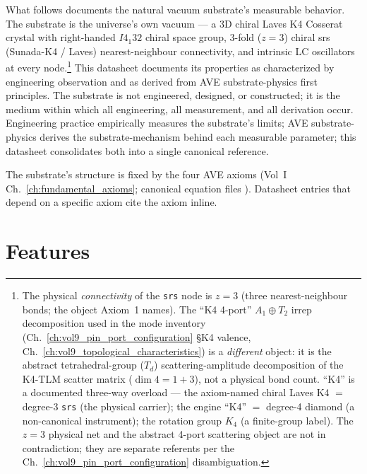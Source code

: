 What follows documents the natural vacuum substrate's measurable behavior. The substrate is the universe's own vacuum --- a 3D chiral Laves K4 Cosserat crystal with right-handed $I4_1 32$ chiral space group, 3-fold ($z=3$) chiral srs (Sunada-K4 / Laves) nearest-neighbour connectivity, and intrinsic LC oscillators at every node.\footnote{The physical \emph{connectivity} of the \texttt{srs} node is $z=3$ (three nearest-neighbour bonds; the object Axiom~1 names). The ``K4 4-port'' $A_1 \oplus T_2$ irrep decomposition used in the mode inventory (Ch.~\ref{ch:vol9_pin_port_configuration} \S K4 valence, Ch.~\ref{ch:vol9_topological_characteristics}) is a \emph{different} object: it is the abstract tetrahedral-group ($T_d$) scattering-amplitude decomposition of the K4-TLM scatter matrix ($\dim 4 = 1 + 3$), not a physical bond count. ``K4'' is a documented three-way overload --- the axiom-named chiral Laves K4 $=$ degree-3 \texttt{srs} (the physical carrier); the engine ``K4'' $=$ degree-4 diamond (a non-canonical instrument); the rotation group $K_4$ (a finite-group label). The $z=3$ physical net and the abstract 4-port scattering object are not in contradiction; they are separate referents per the Ch.~\ref{ch:vol9_pin_port_configuration} disambiguation.} This datasheet documents its properties as characterized by engineering observation and as derived from AVE substrate-physics first principles. The substrate is not engineered, designed, or constructed; it is the medium within which all engineering, all measurement, and all derivation occur. Engineering practice empirically measures the substrate's limits; AVE substrate-physics derives the substrate-mechanism behind each measurable parameter; this datasheet consolidates both into a single canonical reference.

The substrate's structure is fixed by the four AVE axioms (Vol~I Ch.~\ref{ch:fundamental_axioms}; canonical equation files ). Datasheet entries that depend on a specific axiom cite the axiom inline.

\section{Features}
\label{sec:vol9_features}



